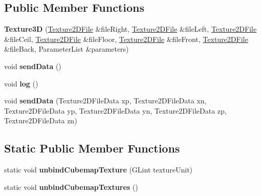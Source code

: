 \subsection*{Public Member Functions}
\begin{DoxyCompactItemize}
\item 
\hypertarget{classfillwave_1_1core_1_1Texture3D_a1ed862dff60f33580f5d57fbcf819a98}{}{\bfseries Texture3\+D} (\hyperlink{classfillwave_1_1core_1_1Texture2DFile}{Texture2\+D\+File} \&file\+Right, \hyperlink{classfillwave_1_1core_1_1Texture2DFile}{Texture2\+D\+File} \&file\+Left, \hyperlink{classfillwave_1_1core_1_1Texture2DFile}{Texture2\+D\+File} \&file\+Ceil, \hyperlink{classfillwave_1_1core_1_1Texture2DFile}{Texture2\+D\+File} \&file\+Floor, \hyperlink{classfillwave_1_1core_1_1Texture2DFile}{Texture2\+D\+File} \&file\+Front, \hyperlink{classfillwave_1_1core_1_1Texture2DFile}{Texture2\+D\+File} \&file\+Back, Parameter\+List \&parameters)\label{classfillwave_1_1core_1_1Texture3D_a1ed862dff60f33580f5d57fbcf819a98}

\item 
\hypertarget{classfillwave_1_1core_1_1Texture3D_abc8228b536c1747f04595b2f488226c7}{}void {\bfseries send\+Data} ()\label{classfillwave_1_1core_1_1Texture3D_abc8228b536c1747f04595b2f488226c7}

\item 
\hypertarget{classfillwave_1_1core_1_1Texture3D_adf6bb166da99f94ee4d98e06537a2c9f}{}void {\bfseries log} ()\label{classfillwave_1_1core_1_1Texture3D_adf6bb166da99f94ee4d98e06537a2c9f}

\item 
\hypertarget{classfillwave_1_1core_1_1Texture3D_ae13bbed3568518d7fdbb65145ac50ffb}{}void {\bfseries send\+Data} (Texture2\+D\+File\+Data xp, Texture2\+D\+File\+Data xn, Texture2\+D\+File\+Data yp, Texture2\+D\+File\+Data yn, Texture2\+D\+File\+Data zp, Texture2\+D\+File\+Data zn)\label{classfillwave_1_1core_1_1Texture3D_ae13bbed3568518d7fdbb65145ac50ffb}

\end{DoxyCompactItemize}
\subsection*{Static Public Member Functions}
\begin{DoxyCompactItemize}
\item 
\hypertarget{classfillwave_1_1core_1_1Texture3D_aaea4339fbea25f9e74ba839526301a36}{}static void {\bfseries unbind\+Cubemap\+Texture} (G\+Lint texture\+Unit)\label{classfillwave_1_1core_1_1Texture3D_aaea4339fbea25f9e74ba839526301a36}

\item 
\hypertarget{classfillwave_1_1core_1_1Texture3D_ac60117095e4aadefe4aa616a88ed1572}{}static void {\bfseries unbind\+Cubemap\+Textures} ()\label{classfillwave_1_1core_1_1Texture3D_ac60117095e4aadefe4aa616a88ed1572}

\end{DoxyCompactItemize}
